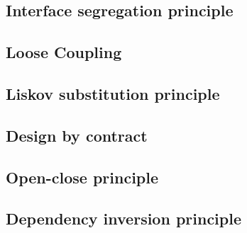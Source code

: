 \subsection{Interface segregation principle}
\subsection{Loose Coupling}
\subsection{Liskov substitution principle}
\subsection{Design by contract}
\subsection{Open-close principle}
\subsection{Dependency inversion principle}




